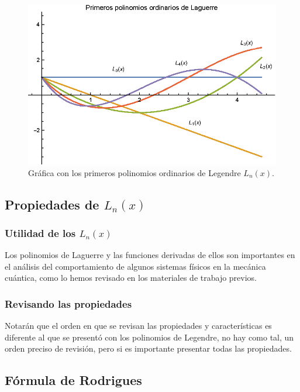 \documentclass[12pt]{beamer}
\begin{document}
\begin{frame}[plain]
\begin{figure}[H]
    \centering
    \includegraphics[scale=0.85]{Imagenes/Polinomios_Laguerre_03.eps}
    \caption{Gráfica con los primeros polinomios ordinarios de Legendre $L_{n}(x)$.}
    \label{fig:grafica_Laguerre_01}
\end{figure}
\end{frame}

\subsection{Propiedades de \texorpdfstring{$L_{n}(x)$}{L n (x)}}

\begin{frame}
\frametitle{Utilidad de los $L_{n}(x)$}
Los polinomios de Laguerre y las funciones derivadas de ellos son importantes en el análisis del comportamiento de algunos sistemas físicos en la mecánica cuántica, como lo hemos revisado en los materiales de trabajo previos.
\end{frame}
\begin{frame}
\frametitle{Revisando las propiedades}
Notarán que el orden en que se revisan las propiedades y características es diferente al que se presentó con los polinomios de Legendre, \pause no hay como tal, un orden preciso de revisión, pero si es importante presentar todas las propiedades.
\end{frame}

\subsection{Fórmula de Rodrigues}
\end{document}
